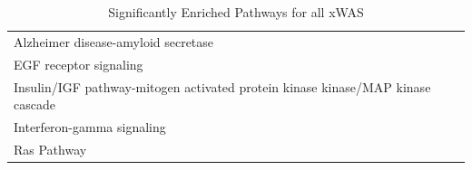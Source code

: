 \begin{table}[H]
\centering
\caption{Significantly Enriched Pathways for all xWAS} 
\label{tab:allenriched}
\begin{tabular}{l}
  \toprule
  \midrule
Alzheimer disease-amyloid secretase \\ 
  EGF receptor signaling \\ 
  Insulin/IGF pathway-mitogen activated protein kinase kinase/MAP kinase cascade \\ 
  Interferon-gamma signaling \\ 
  Ras Pathway \\ 
   \bottomrule
\end{tabular}
\end{table}
